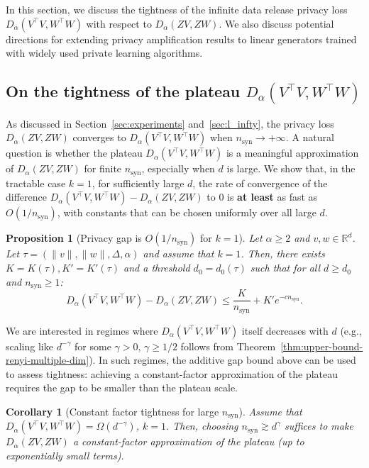 \documentclass{article}
\theoremstyle{plain}
\newtheorem{proposition}{Proposition}[section]
\newtheorem{corollary}{Corollary}[section]
\theoremstyle{definition}
\theoremstyle{remark}
\begin{document}
In this section, we discuss the tightness of the infinite data release privacy loss $D_\alpha(V^\top V, W^\top W)$ with respect to $D_\alpha(ZV,ZW)$. We also discuss potential directions for extending privacy amplification results to linear generators trained with widely used private learning algorithms.

\subsection{On the tightness of the plateau $D_\alpha(V^\top V, W^\top W)$}
\label{subsec:convergence-rate}
As discussed in Section~\ref{sec:experiments} and~\ref{sec:l_infty}, the privacy loss $D_\alpha(ZV,ZW)$ converges to $D_\alpha(V^\top V, W^\top W)$ when $n_{\text{syn}} \to +\infty$.
A natural question is whether the plateau $D_\alpha(V^\top V,W^\top W)$ is a meaningful approximation of $D_\alpha(ZV,ZW)$ for finite $n_{\text{syn}}$, especially when $d$ is large. %
We show that, in the tractable case $k=1$, for sufficiently large $d$,  the rate of convergence of the difference $D_\alpha(V^\top V, W^\top W) - D_\alpha(ZV,ZW)$ to $0$ is \textbf{at least} as fast as $O(1/n_{\text{syn}})$, with constants that can be chosen uniformly over all large $d$.


\begin{proposition}[Privacy gap is $O(1/n_{\text{syn}})$ for $k=1$]
\label{prop:privacy-gap}
     Let $\alpha \geq 2$ and $v,w \in \mathbb{R}^{d}$. Let $\tau = (\|v\|,\|w\|,\Delta,\alpha)$ and assume that $k=1$. Then, there exists $ K = K(\tau), K' = K'(\tau)$ and a threshold $d_0 = d_0(\tau)$ such that for all $d \geq d_0$ and $n_{\text{syn}} \geq 1$:
    \[\textstyle D_\alpha(V^\top V, W^\top W) - D_\alpha(ZV,ZW) \leq  \frac{K}{n_{\text{syn}}} + K' e^{-c n_{\text{syn}}}.\]
\end{proposition}

We are interested in regimes where $D_\alpha(V^\top V,W^\top W)$ itself decreases with $d$ (e.g., scaling like $d^{-\gamma}$ for some $\gamma > 0$, $\gamma \geq 1/2$ follows from Theorem~\ref{thm:upper-bound-renyi-multiple-dim}). In such regimes, the additive gap bound above can be used to assess tightness: achieving a constant-factor approximation of the plateau requires the gap to be smaller than the plateau scale.

\begin{corollary}[Constant factor tightness for large $n_{\text{syn}}$]
\label{corr:privacy-gap-scaling}
    Assume that $D_\alpha(V^\top V,W^\top W) = \Omega(d^{-\gamma})$, $k=1$. Then,  choosing $n_{\text{syn}}\gtrsim d^{\gamma}$ suffices to make $D_\alpha(ZV,ZW)$ a constant-factor approximation of the plateau (up to exponentially small terms).
\end{corollary}
\end{document}
